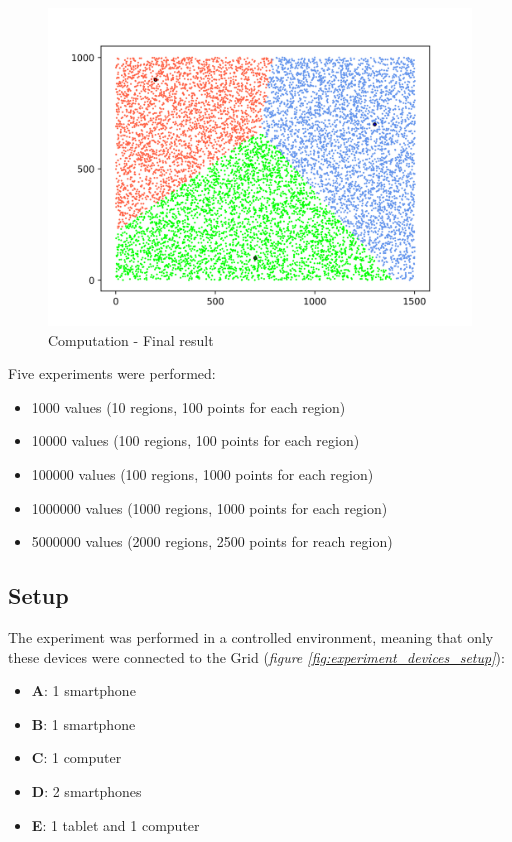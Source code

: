 \begin{figure}[!ht]
    \centering
    \includegraphics[width=\linewidth]{document/chapters/chapter_7/images/computation_final_result.png}
    \caption{Computation - Final result}
    \label{fig:computation_final_result}
\end{figure}

Five experiments were performed:
\begin{itemize}
    \item 1000 values (10 regions, 100 points for each region)
    \item 10000 values (100 regions, 100 points for each region)
    \item 100000 values (100 regions, 1000 points for each region)
    \item 1000000 values (1000 regions, 1000 points for each region)
    \item 5000000 values (2000 regions, 2500 points for reach region)
\end{itemize}

\subsection{Setup}
The experiment was performed in a controlled environment, meaning that only these devices were connected to the Grid (\textit{figure \ref{fig:experiment_devices_setup}}):
\begin{itemize}
    \item \textbf{A}: 1 smartphone
    \item \textbf{B}: 1 smartphone
    \item \textbf{C}: 1 computer
    \item \textbf{D}: 2 smartphones
    \item \textbf{E}: 1 tablet and 1 computer
\end{itemize}

